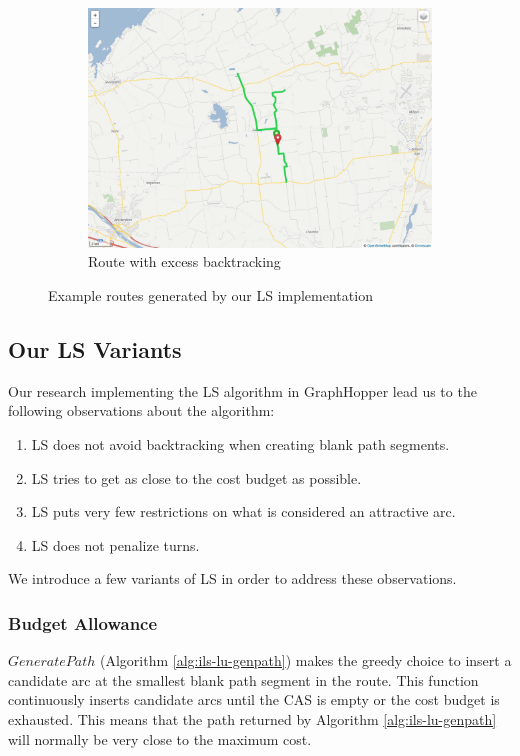 \documentclass[11pt]{article}
\begin{document}
\begin{figure}[h]
\begin{center}
\begin{subfigure}{0.48\linewidth}
\includegraphics[width=\textwidth]{figs/ls-route3}
\caption{Route with excess backtracking}
\label{fig:ls-route3}
\end{subfigure}
\end{center}
\caption{Example routes generated by our LS implementation}
\label{fig:ls-routes}
\end{figure}

\subsection{Our LS Variants}
Our research implementing the LS algorithm in GraphHopper lead us to the following observations about the algorithm:
\begin{enumerate}
    \item LS does not avoid backtracking when creating blank path segments.
    \item LS tries to get as close to the cost budget as possible.
    \item LS puts very few restrictions on what is considered an attractive arc.
    \item LS does not penalize turns.
\end{enumerate}
We introduce a few variants of LS in order to address these observations.

\subsubsection{Budget Allowance}
$GeneratePath$ (Algorithm \ref{alg:ils-lu-genpath}) makes the greedy choice to insert a candidate arc at the smallest blank path segment in the route. This function continuously inserts candidate arcs until the CAS is empty or the cost budget is exhausted. This means that the path returned by Algorithm \ref{alg:ils-lu-genpath} will normally be very close to the maximum cost. 
\end{document}
